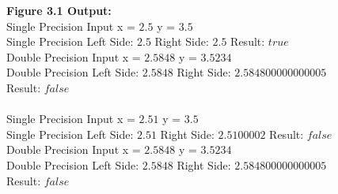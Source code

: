 \documentclass[12pt]{article}
\begin{document}
\begin{figure}[h]
	\textbf{Figure 3.1 Output:}\\
	Single Precision Input x = $2.5$  y = $3.5$ \\
	Single Precision Left Side: $2.5$  Right Side: $2.5$  Result: $true$ \\
	Double Precision Input x = $2.5848$  y = $3.5234$ \\
	Double Precision Left Side: $2.5848$  Right Side:  $2.584800000000005$  Result: $false$ \\ \\
	Single Precision Input x = $2.51$  y = $3.5$ \\
	Single Precision Left Side: $2.51$  Right Side: $2.5100002$  Result: $false$ 
	Double Precision Input x = $2.5848$  y = $3.5234$ \\
	Double Precision Left Side: $2.5848$  Right Side: $2.584800000000005$  Result: $false$
\end{figure}
\end{document}
